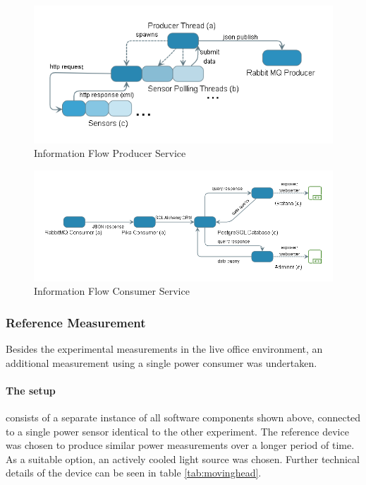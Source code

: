 \begin{figure}
    \centering
    \includegraphics[width=\textwidth]{images/producer_flow.png}
    \caption{Information Flow Producer Service}
    \label{fig:information_flow_producer}
\end{figure}

\begin{figure}
    \centering
    \includegraphics[width=\textwidth]{images/consumer_flow.png}
    \caption{Information Flow Consumer Service}
    \label{fig:information_flow_consumer}
\end{figure}

\subsubsection{Reference Measurement}
Besides the experimental measurements in the live office environment, an additional measurement using a single power consumer was undertaken. 
\paragraph{The setup} consists of a separate instance of all software components shown above, connected to a single power sensor identical to the other experiment. The reference device was chosen to produce similar power measurements over a longer period of time. As a suitable option, an actively cooled light source was chosen. Further technical details of the device can be seen in table \ref{tab:movinghead}.
